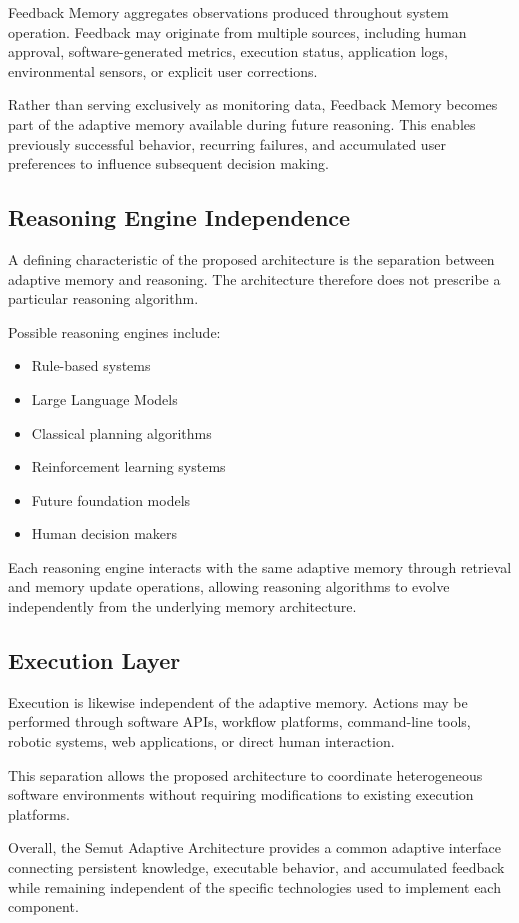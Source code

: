 Feedback Memory aggregates observations produced throughout system operation. Feedback may originate from multiple sources, including human approval, software-generated metrics, execution status, application logs, environmental sensors, or explicit user corrections.

Rather than serving exclusively as monitoring data, Feedback Memory becomes part of the adaptive memory available during future reasoning. This enables previously successful behavior, recurring failures, and accumulated user preferences to influence subsequent decision making.

\subsection{Reasoning Engine Independence}

A defining characteristic of the proposed architecture is the separation between adaptive memory and reasoning. The architecture therefore does not prescribe a particular reasoning algorithm.

Possible reasoning engines include:

\begin{itemize}
\item Rule-based systems
\item Large Language Models
\item Classical planning algorithms
\item Reinforcement learning systems
\item Future foundation models
\item Human decision makers
\end{itemize}

Each reasoning engine interacts with the same adaptive memory through retrieval and memory update operations, allowing reasoning algorithms to evolve independently from the underlying memory architecture.

\subsection{Execution Layer}

Execution is likewise independent of the adaptive memory. Actions may be performed through software APIs, workflow platforms, command-line tools, robotic systems, web applications, or direct human interaction.

This separation allows the proposed architecture to coordinate heterogeneous software environments without requiring modifications to existing execution platforms.

Overall, the Semut Adaptive Architecture provides a common adaptive interface connecting persistent knowledge, executable behavior, and accumulated feedback while remaining independent of the specific technologies used to implement each component.
